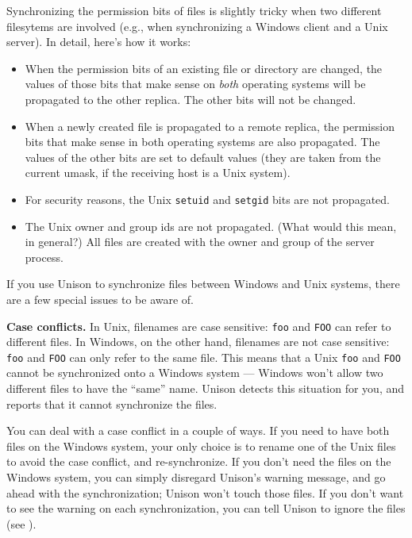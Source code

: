 \documentclass{article}
\begin{document}

Synchronizing the permission bits of files is slightly tricky when two
different filesytems are involved (e.g., when synchronizing a Windows
client and a Unix server).  In detail, here's how it works:
\begin{itemize}
\item When the permission bits of an existing file or directory are
changed, the values of those bits that make sense on {\em both}
operating systems will be propagated to the other replica.  The other
bits will not be changed.  
\item When a newly created file is propagated to a remote replica, the
permission bits that make sense in both operating systems are also
propagated.  The values of the other bits are set to default values
(they are taken from the current umask, if the receiving host is a
Unix system).
\item For security reasons, the Unix \verb|setuid| and \verb|setgid|
bits are not propagated.  
\item The Unix owner and group ids are not propagated.  (What would
this mean, in general?)  All files are created with the owner and
group of the server process.
\end{itemize}



If you use Unison to synchronize files between Windows and Unix
systems, there are a few special issues to be aware of.

\textbf{Case conflicts.}  In Unix, filenames are case sensitive:
\texttt{foo} and \texttt{FOO} can refer to different files.  In
Windows, on the other hand, filenames are not case sensitive:
\texttt{foo} and \texttt{FOO} can only refer to the same file.  This
means that a Unix \texttt{foo} and \texttt{FOO} cannot be synchronized
onto a Windows system --- Windows won't allow two different files to
have the ``same'' name.  Unison detects this situation for you, and
reports that it cannot synchronize the files.  

You can deal with a case conflict in a couple of ways.  If you need to
have both files on the Windows system, your only choice is to rename
one of the Unix files to avoid the case conflict, and re-synchronize.
If you don't need the files on the Windows system, you can simply
disregard Unison's warning message, and go ahead with the
synchronization; Unison won't touch those files.  If you don't want to
see the warning on each synchronization, you can tell Unison to ignore
the files (see ).
\end{document}

